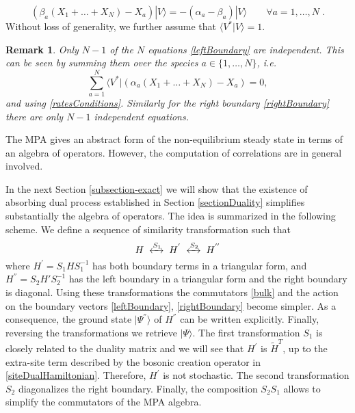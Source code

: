 \documentclass[10pt]{article}
\numberwithin{equation}{section}
\numberwithin{equation}{subsection}
\newtheorem{remark}{Remark}
\newcommand{\dt}{\;.}
\begin{document}
\begin{equation}\label{rightBoundary}
	\left(\beta_{a}(X_{1}+\ldots+X_{N})-X_{a}\right)|V\rangle=-(\alpha_{a}-\beta_{a})|V\rangle\qquad\forall a=1,\ldots,N\dt
\end{equation}
Without loss of generality, we further assume that $\langle V^{*}|V\rangle=1$. 
\begin{remark} Only $N-1$ of the $N$ equations \eqref{leftBoundary}  are independent. This can be seen by summing them over the species $a\in \{1,\ldots,N\}$, i.e.
	\begin{equation}
		\sum_{a=1}^{N}	\langle V^{*}|\left(\alpha_{a}(X_{1}+\ldots+X_{N})-X_{a}\right)=0,%
	\end{equation}
	and using  \eqref{ratesConditions}.
 Similarly for the right boundary  \eqref{rightBoundary} there are only  $N-1$ independent equations. \end{remark} 
The MPA gives an abstract form of the non-equilibrium steady state in terms of an algebra of operators. However, the computation of  correlations are in general involved. 

 In the next Section \ref{subsection-exact} we will show that the existence of absorbing dual process established in Section \ref{sectionDuality} simplifies substantially the algebra of operators. The idea is summarized in the following scheme. 
 We define a sequence of similarity transformation such that 
 \begin{equation}
 	H\;\xleftrightarrow{S_{1}}\;H^{'}\;\xleftrightarrow{S_{2}}\;H^{''}
 \end{equation} 
 where $H^{'}= S_{1} H S_{1}^{-1} $ has both boundary terms in a triangular form, and $H^{''} = S_{2}H' S_{2}^{-1}$ has the left boundary in a triangular form and the right boundary is diagonal. Using these transformations the commutators \eqref{bulk} and the action on the boundary vectors \eqref{leftBoundary}, \eqref{rightBoundary} become simpler. As a consequence, the ground state $|\Psi^{''}\rangle$ of $H^{''}$ can be written explicitly. Finally, reversing the transformations we retrieve $|\Psi\rangle$.
 The first transformation $S_{1}$ is closely related to the duality matrix and we will see that $H^{'}$ is $\widetilde{H}^{T}$, up to the extra-site term described by the bosonic creation operator in \eqref{siteDualHamiltonian}. Therefore, $H^{'}$ is not stochastic. The second transformation $S_{2}$ diagonalizes the right boundary. Finally, the composition  $S_{2} S_{1}$ allows to simplify the commutators of the MPA algebra. 
\end{document}
